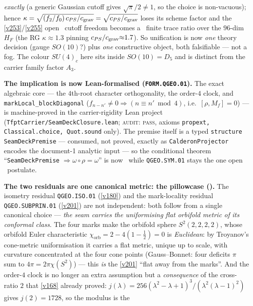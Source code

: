 \emph{exactly} (a generic Gaussian cutoff gives $\sqrt\pi/2\neq1$, so the choice is non-vacuous); hence
$\kappa=\sqrt{(f_2/f_0)\,c_{PS}/c_{\rm grav}}=\sqrt{c_{PS}/c_{\rm grav}}$ loses its scheme factor and the
\vref{v253}/\vref{v255} open \mO\ cutoff freedom becomes a \mC\ finite trace ratio over the $96$-dim $H_F$
(the RG $\kappa{\approx}1.3$ pinning $c_{PS}/c_{\rm grav}{\approx}1.7$).
So
unification is now \emph{one} theory decision (gauge $SO(10)$?) plus \emph{one} constructive object, both
falsifiable --- not a fog. The colour $SU(4)_c$ here sits inside $SO(10){=}D_5$ and is distinct from the
carrier family factor $A_3$.
\par\smallskip\noindent\textbf{The implication is now Lean-formalised (\texttt{FORM.QGEO.01}).} The exact
algebraic core --- the $4$th-root character orthogonality, the order-$4$ clock, and
\texttt{markLocal\_blockDiagonal} ($f_{n-n'}\neq0\Rightarrow(n\equiv n'\bmod4)$, i.e.\ $[\rho,M_f]=0$) ---
is machine-proved in the carrier-rigidity Lean project (\texttt{TfptCarrier/SeamDeckClosure.lean};
\textsc{audit: pass}, axioms \texttt{propext, Classical.choice, Quot.sound} only). The premise itself is a
typed \texttt{structure} \texttt{SeamDeckPremise} --- consumed, not proved, exactly as
\texttt{CalderonProjector} encodes the document-1 analytic input --- so the conditional theorem
``\texttt{SeamDeckPremise} $\Rightarrow\omega\circ\rho=\omega$'' is now \mE\ while
\texttt{QGEO.SYM.01} stays the one open \mO\ postulate.
\par\smallskip\noindent\textbf{The two residuals are one canonical metric: the pillowcase
().} The isometry residual \texttt{QGEO.ISO.01} (\vref{v180}) and the
mark-locality residual \texttt{QGEO.SUBPRIN.01} (\vref{v201}) are not independent: both follow from a
single canonical choice --- \emph{the seam carries the uniformising flat orbifold metric of its conformal
class}. The four marks make the orbifold sphere $S^2(2,2,2,2)$, whose orbifold Euler characteristic
$\chi_{\mathrm{orb}}=2-4(1-\tfrac12)=0$ is \emph{Euclidean}: by Troyanov's cone-metric uniformisation it
carries a flat metric, unique up to scale, with curvature concentrated at the four cone points
(Gauss--Bonnet: four deficits $\pi$ sum to $4\pi=2\pi\chi(S^2)$) --- this \emph{is} the \vref{v201}
``flat away from the marks''. And the order-$4$ clock is no longer an extra assumption but a
\emph{consequence} of the cross-ratio $2$ that \vref{v168} already proved:
$j(\lambda)=256(\lambda^2-\lambda+1)^3/(\lambda^2(\lambda-1)^2)$ gives $j(2)=1728$, so the modulus is the
